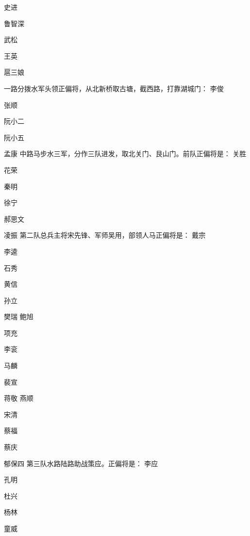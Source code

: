 史进

鲁智深

武松

王英

扈三娘

一路分拨水军头领正偏将，从北新桥取古塘，截西路，打靠湖城门：
李俊

张顺

阮小二

阮小五

孟康
中路马步水三军，分作三队进发，取北关门、艮山门。前队正偏将是：
关胜

花荣

秦明

徐宁

郝思文

凌振
第二队总兵主将宋先锋、军师吴用，部领人马正偏将是：
戴宗

李逵

石秀

黄信

孙立

樊瑞
鲍旭

项充

李衮

马麟

裴宣

蒋敬
燕顺

宋清

蔡福

蔡庆

郁保四
第三队水路陆路助战策应。正偏将是：
李应

孔明

杜兴

杨林

童威

